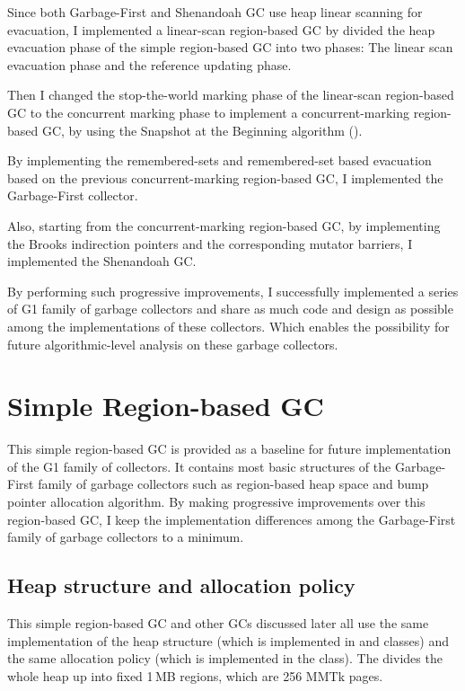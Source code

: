 Since both Garbage-First and Shenandoah GC use heap linear scanning for evacuation,
I implemented a linear-scan region-based GC by divided the heap evacuation phase
of the simple region-based GC into two phases: The linear scan evacuation phase
and the reference updating phase.

Then I changed the stop-the-world marking phase of the linear-scan region-based GC
to the concurrent marking phase to implement a concurrent-marking region-based GC, 
by using the Snapshot at the Beginning algorithm (\cite{yuasa1990real}).

By implementing the remembered-sets and remembered-set based evacuation based on
the previous concurrent-marking region-based GC, I implemented the Garbage-First collector.

Also, starting from the concurrent-marking region-based GC, by implementing the Brooks indirection pointers
and the corresponding mutator barriers, I implemented the Shenandoah GC.

By performing such progressive improvements, I successfully implemented a series of
G1 family of garbage collectors and share as much code and design as possible
among the implementations of these collectors. Which enables the possibility for future
algorithmic-level analysis on these garbage collectors.

\section{Simple Region-based GC}
\label{sec:simpleregiongc}

This simple region-based GC is provided as a baseline for future implementation of the G1 family of collectors.
It contains most basic structures of the Garbage-First family of garbage collectors such as
region-based heap space and bump pointer allocation algorithm. By making progressive improvements
over this region-based GC, I keep the implementation differences among the
Garbage-First family of garbage collectors to a minimum.

\subsection{Heap structure and allocation policy}

This simple region-based GC and other GCs discussed later all use the same implementation of the
heap structure (which is implemented in  and  classes) and the
same allocation policy (which is implemented in the  class).
The  divides the whole heap up into fixed 1\,MB regions, which
are 256 MMTk pages.

